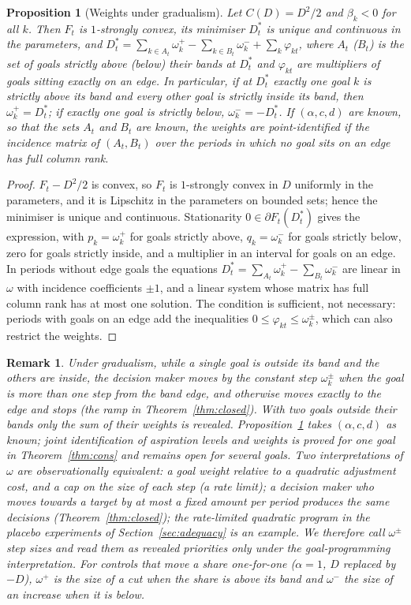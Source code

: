 \documentclass[pdflatex,sn-basic]{sn-jnl}
\theoremstyle{thmstyleone}\newtheorem{proposition}{Proposition}\newtheorem{theorem}{Theorem}
\theoremstyle{thmstylethree}\newtheorem{remark}{Remark}
\begin{document}
\begin{proposition}[Weights under gradualism]\label{prop:quad}
Let $C(D)=D^2/2$ and $\beta_k<0$ for all $k$. Then $F_t$ is $1$-strongly convex, its minimiser $D^*_t$ is unique and continuous in the parameters, and $D^*_t=\sum_{k\in A_t}\omega_k^+-\sum_{k\in B_t}\omega_k^-+\sum_k\varphi_{kt}$, where $A_t$ ($B_t$) is the set of goals strictly above (below) their bands at $D^*_t$ and $\varphi_{kt}$ are multipliers of goals sitting exactly on an edge. In particular, if at $D^*_t$ exactly one goal $k$ is strictly above its band and every other goal is strictly inside its band, then $\omega_k^+=D^*_t$; if exactly one goal is strictly below, $\omega_k^-=-D^*_t$. If $(\alpha,c,d)$ are known, so that the sets $A_t$ and $B_t$ are known, the weights are point-identified if the incidence matrix of $(A_t,B_t)$ over the periods in which no goal sits on an edge has full column rank.
\end{proposition}
\begin{proof}
$F_t-D^2/2$ is convex, so $F_t$ is $1$-strongly convex in $D$ uniformly in the parameters, and it is Lipschitz in the parameters on bounded sets; hence the minimiser is unique and continuous. Stationarity $0\in\partial F_t(D^*_t)$ gives the expression, with $p_k=\omega_k^+$ for goals strictly above, $q_k=\omega_k^-$ for goals strictly below, zero for goals strictly inside, and a multiplier in an interval for goals on an edge. In periods without edge goals the equations $D^*_t=\sum_{A_t}\omega_k^+-\sum_{B_t}\omega_k^-$ are linear in $\omega$ with incidence coefficients $\pm1$, and a linear system whose matrix has full column rank has at most one solution. The condition is sufficient, not necessary: periods with goals on an edge add the inequalities $0\le\varphi_{kt}\le\omega_k^\pm$, which can also restrict the weights.
\end{proof}
\begin{remark}
Under gradualism, while a single goal is outside its band and the others are inside, the decision maker moves by the constant step $\omega_k^\pm$ when the goal is more than one step from the band edge, and otherwise moves exactly to the edge and stops (the ramp in Theorem~\ref{thm:closed}). With two goals outside their bands only the sum of their weights is revealed. Proposition~\ref{prop:quad} takes $(\alpha,c,d)$ as known; joint identification of aspiration levels and weights is proved for one goal in Theorem~\ref{thm:cons} and remains open for several goals. Two interpretations of $\omega$ are observationally equivalent: a goal weight relative to a quadratic adjustment cost, and a cap on the size of each step (a rate limit); a decision maker who moves towards a target by at most a fixed amount per period produces the same decisions (Theorem~\ref{thm:closed}); the rate-limited quadratic program in the placebo experiments of Section~\ref{sec:adequacy} is an example. We therefore call $\omega^\pm$ step sizes and read them as revealed priorities only under the goal-programming interpretation. For controls that move a share one-for-one ($\alpha=1$, $D$ replaced by $-D$), $\omega^+$ is the size of a cut when the share is above its band and $\omega^-$ the size of an increase when it is below.
\end{remark}
\end{document}
